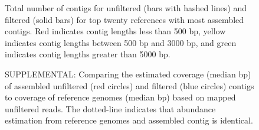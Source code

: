 \documentclass[11pt]{article} %
\begin{document}
\begin{landscape}
\begin{figure}[h!]
\caption{Total number of contigs for unfiltered (bars with hashed lines) and filtered (solid bars) for top twenty references with most assembled contigs.  Red indicates contig lengths less than 500 bp, yellow indicates contig lengths between 500 bp and 3000 bp, and green indicates contig lengths greater than 5000 bp.}
\label{contig-lengths}
\end{figure}
\end{landscape}

\begin{figure}[h!]
\caption{SUPPLEMENTAL:  Comparing the estimated coverage (median bp) of assembled unfiltered (red circles) and filtered (blue circles) contigs to coverage of reference genomes (median bp) based on mapped unfiltered reads.  The dotted-line indicates that abundance estimation from reference genomes and assembled contig is identical.}
\label{coveragecompare}
\end{figure}
\end{document}
